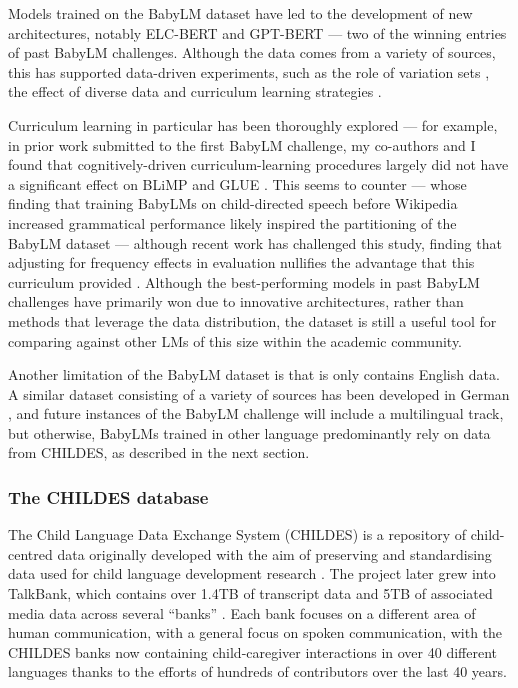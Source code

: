 Models trained on the BabyLM dataset have led to the development of new architectures, notably ELC-BERT \citep{georges-gabriel-charpentier-samuel-2023-layers} and GPT-BERT \citet{charpentier2024gpt} --- two of the winning entries of past BabyLM challenges. Although the data comes from a variety of sources, this has supported data-driven experiments, such as the role of variation sets \citep{haga-etal-2024-babylm}, the effect of diverse data \citep{yam-paek-2024-baby} and curriculum learning strategies \citep[e.g.][]{debenedetto-2023-byte, nguyen-etal-2024-automatic, capone-etal-2024-concretegpt}.

Curriculum learning in particular has been thoroughly explored --- for example, in prior work submitted to the  first BabyLM challenge, my co-authors and I found that cognitively-driven curriculum-learning procedures largely did not have a significant effect on BLiMP and GLUE \citep{martinez-etal-2023-climb}. This seems to counter \citet{huebner-etal-2021-babyberta} --- whose finding that training BabyLMs on child-directed speech before Wikipedia increased grammatical performance likely inspired the partitioning of the BabyLM dataset --- although recent work has challenged this study, finding that adjusting for frequency effects in evaluation nullifies the advantage that this curriculum provided \citep{padovani2025child}. Although the best-performing models in past BabyLM challenges have primarily won due to innovative architectures, rather than methods that leverage the data distribution, the dataset is still a useful tool for comparing against other LMs of this size within the academic community.


Another limitation of the BabyLM dataset is that is only contains English data. A similar dataset consisting of a variety of sources has been developed in German \citep{bunzeck2025constructiondistributionsshapeformal}, and future instances of the BabyLM challenge will include a multilingual track, but otherwise, BabyLMs trained in other language predominantly rely on data from CHILDES, as described in the next section. 

\subsubsection{The CHILDES database}\label{sec:12-childes}

The Child Language Data Exchange System (CHILDES) is a repository of child-centred data originally developed with the aim of preserving and standardising data used for child language development research \citep{macwhinney1985child}. The project later grew into TalkBank, which contains over 1.4TB of transcript data and 5TB of associated media data across several ``banks'' \citep{macwhinney_understanding_2019}. Each bank focuses on a different area of human communication, with a general focus on spoken communication, with the CHILDES banks now containing child-caregiver interactions in over 40 different languages thanks to the efforts of hundreds of contributors over the last 40 years. 

